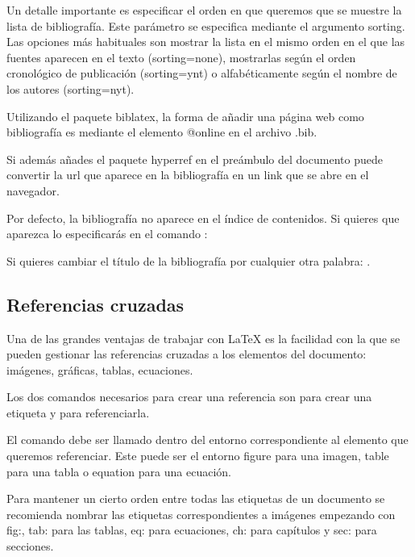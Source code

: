 \documentclass[11pt, a4paper]{article}
\begin{document}
	
	
Un detalle importante es especificar el orden en que queremos que se muestre la lista de bibliografía. Este parámetro se especifica mediante el argumento sorting. Las opciones más habituales son mostrar la lista en el mismo orden en el que las fuentes aparecen en el texto (sorting=none), mostrarlas según el orden cronológico de publicación (sorting=ynt) o alfabéticamente según el nombre de los autores (sorting=nyt).

Utilizando el paquete biblatex, la forma de añadir una página web como bibliografía es mediante el elemento @online en el archivo .bib.

Si además añades el paquete hyperref en el preámbulo del documento puede convertir la url que aparece en la bibliografía en un link que se abre en el navegador.

Por defecto, la bibliografía no aparece en el índice de contenidos. Si quieres que aparezca lo especificarás en el comando : 

Si quieres cambiar el título de la bibliografía por cualquier otra palabra: .

\subsection{Referencias cruzadas}

Una de las grandes ventajas de trabajar con LaTeX es la facilidad con la que se pueden gestionar las referencias cruzadas a los elementos del documento: imágenes, gráficas, tablas, ecuaciones.

Los dos comandos necesarios para crear una referencia son  para crear una etiqueta y  para referenciarla.

El comando  debe ser llamado dentro del entorno correspondiente al elemento que queremos referenciar. Este puede ser el entorno figure para una imagen, table para una tabla o equation para una ecuación.

Para mantener un cierto orden entre todas las etiquetas de un documento se recomienda nombrar las etiquetas correspondientes a imágenes empezando con fig:, tab: para las tablas, eq: para ecuaciones, ch: para capítulos y sec: para secciones.
\end{document}
